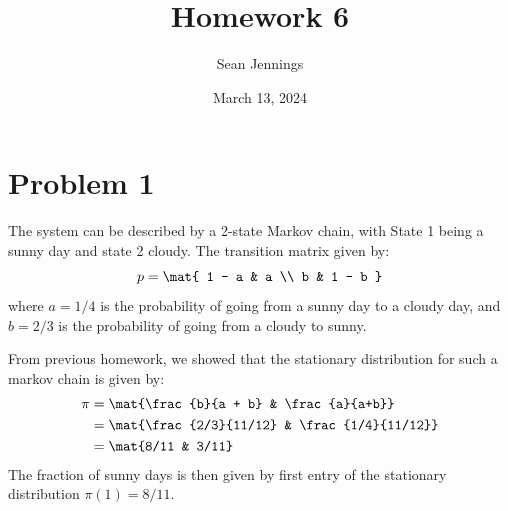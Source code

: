 \documentclass{homework}
\title{Homework 6}
\author{Sean Jennings}
\date{March 13, 2024}
\begin{document}
\maketitle

\section{Problem 1}
The system can be described by a 2-state Markov chain, with
State 1 being a sunny day and state 2 cloudy. The
transition matrix given by:
\begin{equation*}
    p = \mat{
        1 - a & a \\
        b & 1 - b
    }
\end{equation*}
where $a = 1/4$ is the probability of going from a sunny day to 
a cloudy day, and $b = 2/3$ is the probability of going from a cloudy
to sunny.

From previous homework, we showed that the stationary distribution for
such a markov chain is given by:
\begin{align*}
    \pi &= \mat{\frac{b}{a + b} & \frac{a}{a+b}} \\
        &= \mat{\frac{2/3}{11/12} & \frac{1/4}{11/12}} \\
        &= \mat{8/11 & 3/11}
\end{align*}
The fraction of sunny days is then given by first entry of the stationary
distribution $\pi(1) = 8/11$.
\end{document}
